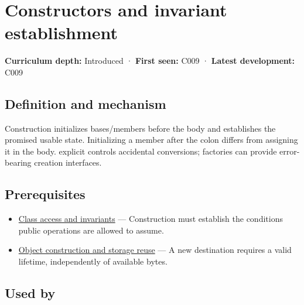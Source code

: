 \hypertarget{appendix-7f8ec83d0886}{}\label{referencestart:appendix-7f8ec83d0886}
\section{Constructors and invariant establishment}\label{appendix-7f8ec83d0886-constructors-and-invariant-establishment}

\hypertarget{appendix-7f8ec83d0886-constructors-and-invariant-establishment}{}

\textbf{Curriculum depth:} Introduced · \textbf{First seen:} C009 · \textbf{Latest development:} C009

\begin{allmightroledefinition}

\subsection{Definition and mechanism}\label{appendix-7f8ec83d0886-definition-and-mechanism}

\hypertarget{appendix-7f8ec83d0886-definition-and-mechanism}{}

Construction initializes bases/members before the body and establishes the promised usable state. Initializing a member after the colon differs from assigning it in the body. explicit controls accidental conversions; factories can provide error-bearing creation interfaces.

\end{allmightroledefinition}

\subsection{Prerequisites}\label{appendix-7f8ec83d0886-prerequisites}

\hypertarget{appendix-7f8ec83d0886-prerequisites}{}

\begin{itemize}
\tightlist
\item
  \hyperref[appendix-8e5214819615]{Class access and invariants} --- Construction must establish the conditions public operations are allowed to assume.
\item
  \hyperref[appendix-a82f9c438857]{Object construction and storage reuse} --- A new destination requires a valid lifetime, independently of available bytes.
\end{itemize}

\subsection{Used by}\label{appendix-7f8ec83d0886-used-by}

